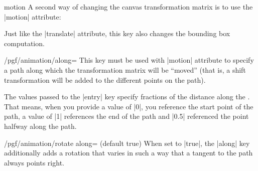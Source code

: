 \begin{animateattribute}{motion}
    A second way of changing the canvas transformation matrix is to use the
    |motion| attribute:
\begin{codeexample}[
    preamble={\usepgfmodule{animations}},
    animation list={0.5,1,1.5,2},
]
\end{codeexample}

    Just like the |translate| attribute, this key also changes the bounding box
    computation.
    \begin{key}{/pgf/animation/along=}
        This key must be used with |motion| attribute to specify a path along
        which the transformation matrix will be ``moved'' (that is, a shift
        transformation will be added to the different points on the path).

        The values passed to the |entry| key specify fractions of the distance
        along the . That means, when you provide a value of |0|, you
        reference the start point of the path, a value of |1| references the
        end of the path and |0.5| referenced the point halfway along the path.
\begin{codeexample}[
    preamble={\usepgfmodule{animations}},
    animation list={0.25,0.5,0.75,1,1.25,1.5,1.75,2,2.25,2.5},
]
\end{codeexample}
    \end{key}

    \begin{key}{/pgf/animation/rotate along= (default true)}
        When set to |true|, the |along| key additionally adds a rotation that
        varies in such a way that a tangent to the path always points right.
\begin{codeexample}[
    preamble={\usepgfmodule{animations}},
    animation list={0.5,1,1.5,2},
]
\end{codeexample}
    \end{key}
\end{animateattribute}

